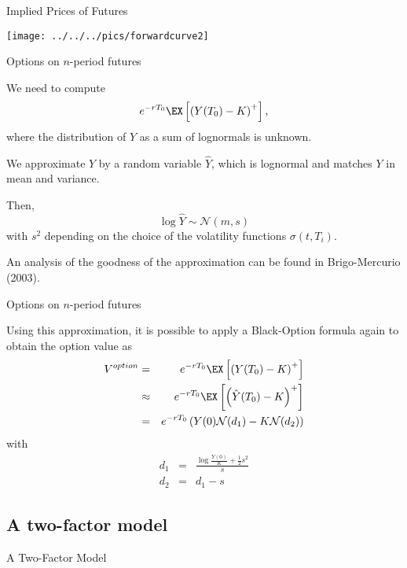 


{Implied Prices of Futures}
\begin{center}
\texttt{[image: ../../../pics/forwardcurve2]}
\end{center}

{Options on $n$-period futures}






	We need to compute
$$e^{-rT_0} \EX \left[\left(Y(T_0)-K\right)^+\right],$$
where the distribution of $Y$ as a sum of lognormals is unknown.

We approximate $Y$ by a random variable $\hat{Y}$,
which is lognormal and matches $Y$ in mean and variance.

Then,
$$\log \hat{Y} \sim \mathcal{N}(m,s)$$
with $s^2$ depending on the choice of the volatility functions
$\sigma(t,T_i)$.

An analysis of the goodness of the approximation
can be found in Brigo-Mercurio (2003).






{Options on $n$-period futures}

Using this approximation, it
is possible to apply a Black-Option formula again to obtain the
option value as
\begin{eqnarray}\label{eq:approx-option}
V^{option} & = & e^{-rT_0} \EX \left[\left(Y(T_0)-K\right)^+\right] \nonumber \\
& \approx & e^{-rT_0} \EX \left[\left(\hat{Y}(T_0)-K\right)^+\right]\nonumber \\
& = &  e^{-rT_0} \left(Y(0)\mathcal{N}(d_1)-K\mathcal{N}(d_2)\right)
\end{eqnarray}
with
\begin{eqnarray*}
d_1& = & \frac{\log \frac{Y(0)}{K}+\frac{1}{2}s^2}{s}\\
d_2 & = & d_1 - s
\end{eqnarray*}

\subsection{A two-factor model}

{A Two-Factor Model}




